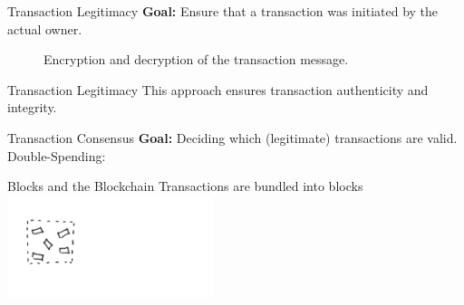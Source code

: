 \documentclass[]{beamer}
\begin{document}
\begin{frame}{Transaction Legitimacy}
\textbf{Goal:} Ensure that a transaction was initiated by the actual owner.\\ \vspace{1em}

	\begin{figure}[h!]
		\center
		
		\caption{Encryption and decryption of the transaction message.}
		\label{fig:asymmeinfach}
	\end{figure}
\end{frame}

\begin{frame}{Transaction Legitimacy}
	\vspace{1em}
This approach ensures transaction \color{focus}authenticity \color{black}and \color{focus}integrity\color{black}.
	\vspace{1em}
\uncover<1->{
	\begin{figure}[h!]
		\center
		
	\end{figure}
	}
\end{frame}

\begin{frame}{Transaction Consensus}
\textbf{Goal: }Deciding which (legitimate) transactions are valid. \\
\vspace{1em}
Double-Spending: \\
\begin{figure}[h!]
	\center
	
\end{figure}
\end{frame}

\begin{frame}{Blocks and the Blockchain}
Transactions are bundled into blocks \\
\includegraphics[width=6cm]{../assets/images/block_1.png} \\
\end{frame}
\end{document}
